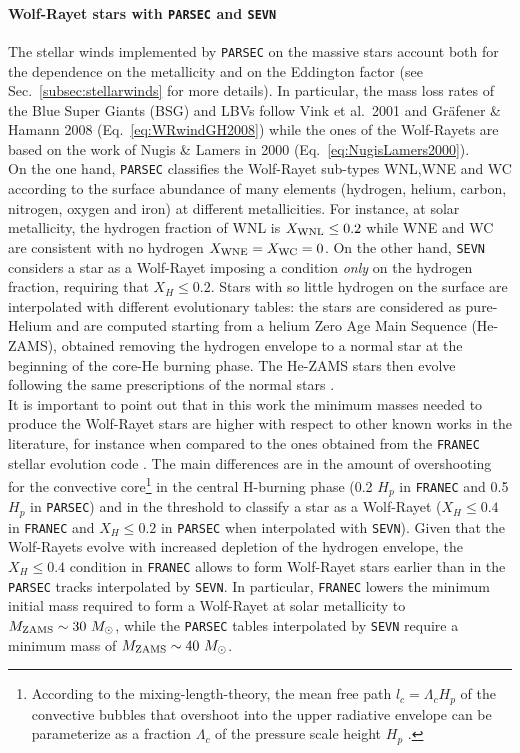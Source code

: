 \documentclass[a4paper,titlepage]{book}     	%
\newcommand{\sun}{\ensuremath{_\odot}}
\newcommand{\mzams}{M_\textup{ZAMS}}
\newcommand{\msun}{\ensuremath{M\sun}}
\begin{document}
\paragraph{Wolf-Rayet stars with \texttt{PARSEC} and \texttt{SEVN}} The stellar winds implemented by \texttt{PARSEC} on the massive stars account both for the dependence on the metallicity and on the Eddington factor (see Sec.\ \ref{subsec:stellarwinds} for more details). In particular, the mass loss rates of the Blue Super Giants (BSG) and LBVs follow Vink et al.\ 2001 and Gr{\"a}fener \& Hamann 2008 (Eq.\ \ref{eq:WRwindGH2008}) while the ones of the Wolf-Rayets are based on the work of Nugis \& Lamers in 2000 (Eq.\ \ref{eq:NugisLamers2000}).\\

On the one hand, \texttt{PARSEC} classifies the Wolf-Rayet sub-types WNL,WNE and WC according to the surface abundance of many elements (hydrogen, helium, carbon, nitrogen, oxygen and iron) at different metallicities. For instance, at solar metallicity, the hydrogen fraction of WNL is $X_{\rm WNL} \leq 0.2$ while WNE and WC are consistent with no hydrogen $X_{\rm WNE} = X_{\rm WC} = 0$. On the other hand, \texttt{SEVN} considers a star as a Wolf-Rayet imposing a condition \emph{only} on the hydrogen fraction, requiring that $X_H \leq 0.2$. Stars with so little hydrogen on the surface are interpolated with different evolutionary tables: the stars are considered as pure-Helium and are computed starting from a helium Zero Age Main Sequence (He-ZAMS), obtained removing the hydrogen envelope to a normal star at the beginning of the core-He burning phase. The He-ZAMS stars then evolve following the same prescriptions of the normal stars \cite{spera2019_mergingBBH}.\\

It is important to point out that in this work the minimum masses needed to produce the Wolf-Rayet stars are higher with respect to other known works in the literature, for instance when compared to the ones obtained from the \texttt{FRANEC} stellar evolution code \cite{Limongi2010_preSNevo}. The main differences are in the amount of overshooting for the convective core\footnote{According to the mixing-length-theory, the mean free path $l_c = \Lambda_c H_p$ of the convective bubbles that overshoot into the upper radiative envelope can be parameterize as a fraction $\Lambda_c$ of the pressure scale height $H_p$ \cite{parsec2015_chen}.} in the central H-burning phase (0.2 $H_p$ in \texttt{FRANEC} and 0.5 $H_p$ in \texttt{PARSEC}) and in the threshold to classify a star as a Wolf-Rayet ($X_H \leq 0.4$ in \texttt{FRANEC} and $X_H \leq 0.2$ in \texttt{PARSEC} when interpolated with \texttt{SEVN}). Given that the Wolf-Rayets evolve with increased depletion of the hydrogen envelope, the $X_H \leq 0.4$ condition in \texttt{FRANEC} allows to form Wolf-Rayet stars earlier than in the \texttt{PARSEC} tracks interpolated by \texttt{SEVN}. In particular, \texttt{FRANEC} lowers the minimum initial mass required to form a Wolf-Rayet at solar metallicity to $\mzams \sim 30~\msun$, while the \texttt{PARSEC} tables interpolated by \texttt{SEVN} require a minimum mass of $\mzams \sim 40~\msun$. 
\end{document}
